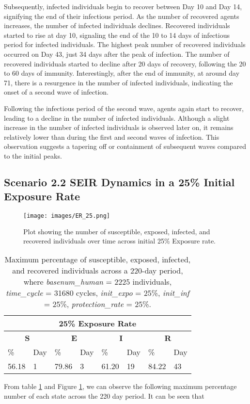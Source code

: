 Subsequently, infected individuals begin to recover between Day 10 and Day 14, signifying the end of their infectious period. As the number of recovered agents increases, the number of infected individuals declines. Recovered individuals started to rise at day 10, signaling the end of the 10 to 14 days of infectious period for infected individuals. The highest peak number of  recovered individuals occurred on Day 43, just 34 days after the peak of infection. The number of recovered individuals started to decline after 20 days of recovery, following the 20 to 60 days of immunity. Interestingly, after the end of immunity, at around day 71, there is a resurgence in the number of infected individuals, indicating the onset of a second wave of infection.

Following the infectious period of the second wave, agents again start to recover, leading to a decline in the number of infected individuals. Although a slight increase in the number of infected individuals is observed later on, it remains relatively lower than during the first and second waves of infection. This observation suggests a tapering off or containment of subsequent waves compared to the initial peaks.

\subsection{ Scenario 2.2 SEIR Dynamics in a 25\% Initial Exposure Rate}
\begin{figure}[H]
	\centering
	\texttt{[image: images/ER\_25.png]}
	\caption{Plot showing the number of susceptible, exposed, infected, and recovered individuals over time across initial 25\% Exposure rate. }
	\label{fig:18}
\end{figure}
\begin{table} [H]
	\centering
	\begin{tabular}{|l|l|l|l|l|l|l|l|}
		\hline
		\multicolumn{8}{|c|}{\textbf{25\% Exposure Rate}}\\
		\hline
		\multicolumn{2}{|c|}{\textbf{S}} &  \multicolumn{2}{c|}{\textbf{E}}&  \multicolumn{2}{c|}{\textbf{I}}&  \multicolumn{2}{c|}{\textbf{R}}\\
		\hline
		\%& Day & \% & Day & \%  & Day & \% & Day \\
		\hline
		56.18& 1 &79.86& 3 &  61.20& 19& 84.22&43\\
		\hline
	\end{tabular}
	\caption{Maximum percentage of susceptible, exposed, infected, and recovered individuals across a 220-day period, where \textit{basenum\_human} = 2225 individuals, \textit{time\_cycle} = 31680 cycles, \textit{init\_expo} = 25\%, \textit{init\_inf} = 25\%,  \textit{protection\_rate} = 25\%.}
	\label{ER2_Max}
\end{table}
From table \ref{ER2_Max} and Figure \ref{fig:18}, we can observe the following maximum percentage number of each state across the 220 day period. It can be seen that 

